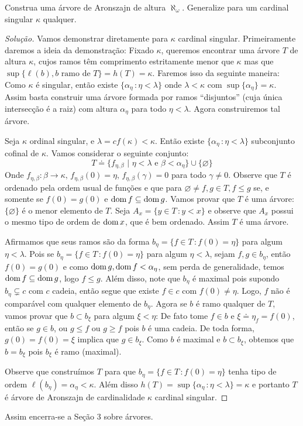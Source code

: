 \documentclass[a4paper]{article}
\begin{document}
 \begin{exercicio}
  Construa uma árvore de Aronszajn de altura \(\aleph_{\omega}\). Generalize
  para um cardinal singular \(\kappa\) qualquer.
\end{exercicio}
\begin{proof}[Solução]
Vamos demonstrar diretamente para \(\kappa\) cardinal singular.
 Primeiramente daremos a ideia da demonstração: Fixado \(\kappa\), queremos
 encontrar uma árvore \(T\) de altura \(\kappa\), cujos ramos têm comprimento
 estritamente  menor que \(\kappa\) mas que \(\sup \{\ell(b), b\text{ ramo de
 }T\}=h(T)=\kappa\). Faremos isso da seguinte maneira: Como \(\kappa\) é singular,
 então existe \(\{\alpha_\eta\,\colon\eta<\lambda\}\) onde \(\lambda<\kappa\)
 com \mbox{\(\sup\{\alpha_\eta\}=\kappa\)}. Assim basta construir uma árvore formada
 por  ramos ``disjuntos''  (cuja única intersecção é a raiz) com altura
 \(\alpha_\eta\)  para todo \(\eta<\lambda\). Agora construiremos tal árvore.
 
 Seja \(\kappa\) ordinal singular, e \(\lambda=cf(\kappa)<\kappa\). Então existe
 \(\{\alpha_\eta\,\colon \eta<\lambda\}\) subconjunto cofinal de \(\kappa\).
 Vamos considerar o seguinte
 conjunto: \[T\doteq\big\{f_{\eta,\beta}\text{ | }\eta<\lambda\text{ e
   }\beta<\alpha_{\eta}\}\cup\big\{\varnothing\big\}\]
   Onde \(f_{\eta,\beta}\colon\beta\to\kappa,\, f_{\eta,\beta}(0)=\eta,\, f_{\eta,\beta}(\gamma)=0\) para todo \(\gamma\neq0\). 
 Observe que \(T\) é ordenado pela ordem usual de funções e que para
 \(\varnothing\neq f,g\in T, f\leq g\) se, e somente se  \(f(0)=g(0)\) e
 \(\operatorname{dom} f\subseteq\operatorname{dom} g\).
 Vamos provar que \(T\) é uma árvore:  \(\{\varnothing\}\) é o menor elemento de
 \(T\). Seja \mbox{\(A_x=\{y\in T\,\colon y<x\}\)} e observe que \(A_x\) possui o mesmo
 tipo de ordem de  \(\operatorname{dom} x\), que é bem ordenado. Assim \(T\) é uma árvore. 
 
 Afirmamos que seus ramos são da forma \(b_\eta=\{f\in T\,\colon f(0)=\eta\}\) para algum
 \(\eta<\lambda\). Pois se \mbox{\(b_\eta=\{f\in T\,\colon f(0)=\eta\}\)} para algum
 \(\eta<\lambda\), sejam \(f,g\in b_\eta\), então \(f(0)=g(0)\) e como
 \(\operatorname{dom} g,\operatorname{dom} f<\alpha_\eta\), sem perda de generalidade,
 temos \(\operatorname{dom} f\subseteq\operatorname{dom} g\), logo \(f\leq g\). Além disso,
 note que \(b_\eta\) é
 maximal pois supondo \(b_\eta\subsetneq c\) com \(c\) cadeia, então segue que existe
 \(f\in c\) com \(f(0)\neq\eta\). Logo, \(f\) não é comparável com qualquer
 elemento de \(b_\eta\). Agora se \(b\) é ramo qualquer de \(T\), vamos provar
 que \(b\subset b_\xi\) para algum \(\xi<\eta\): De fato tome \(f\in b\) e
 \(\xi\doteq \eta_f=f(0)\), então se \(g\in b\), ou \(g\leq f\) ou \(g\geq f\)
 pois  \(b\) é uma cadeia. De toda forma, \(g(0)=f(0)=\xi\) implica que \( g\in
 b_\xi\). Como \(b\) é maximal e \(b\subset b_\xi\), obtemos que \(b=b_\xi\) pois
 \(b_\xi\) é ramo (maximal). 
 
 Observe que construímos \(T\) para que \(b_\eta=\{f\in T\,\colon f(0)=\eta\}\) tenha
 tipo de ordem \(\ell(b_\eta)=\alpha_\eta<\kappa\). Além disso
 \(h(T)=\sup\{\alpha_\eta\,\colon\eta<\lambda\}=\kappa\) e portanto \(T\) é
 árvore de Aronszajn de cardinalidade \(\kappa\) cardinal singular.
 
\end{proof}

Assim encerra-se a Seção 3 sobre árvores.
  
  
\end{document}

